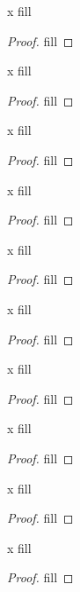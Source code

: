 \begin{exercise}{x}
fill
\end{exercise}
\begin{proof}
fill
\end{proof} 

\begin{exercise}{x}
fill
\end{exercise}
\begin{proof}
fill
\end{proof} 

\begin{exercise}{x}
fill
\end{exercise}
\begin{proof}
fill
\end{proof} 

\begin{exercise}{x}
fill
\end{exercise}
\begin{proof}
fill
\end{proof} 

\begin{exercise}{x}
fill
\end{exercise}
\begin{proof}
fill
\end{proof} 

\begin{exercise}{x}
fill
\end{exercise}
\begin{proof}
fill
\end{proof} 

\begin{exercise}{x}
fill
\end{exercise}
\begin{proof}
fill
\end{proof} 

\begin{exercise}{x}
fill
\end{exercise}
\begin{proof}
fill
\end{proof} 

\begin{exercise}{x}
fill
\end{exercise}
\begin{proof}
fill
\end{proof} 

\begin{exercise}{x}
fill
\end{exercise}
\begin{proof}
fill
\end{proof} 


